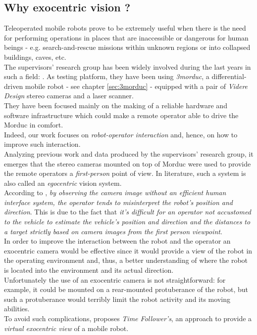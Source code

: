 \subsection{Why exocentric vision ?}
\label{sec:exo:why_exocetric}

Teleoperated mobile robots prove to be extremely useful 
when there is the need for performing operations in places that 
are inaccessible or dangerous for human beings - e.g. 
search-and-rescue missions within unknown regions or into 
collapsed buildings, caves, etc.
\\
The supervisors' research group has been widely involved 
during the last years in such a field: \cite{livatino2010}.
As testing platform, they have been using \textit{3morduc},
a differential-driven mobile robot - see chapter \ref{sec:3morduc} -
equipped with a pair of \textit{Videre Design} \cite{videredesign} 
stereo cameras and a laser scanner.
\\
They have been focused 
mainly on the making of a reliable hardware and software 
infrastructure which could make a remote operator able to drive 
the Morduc in comfort.
\\
Indeed, our work focuses on \textit{robot-operator interaction} and, 
hence, on how to improve such interaction. 
\\
Analyzing previous work and data produced by the supervisors' 
research group, it emerges that the stereo cameras mounted on 
top of Morduc were used to provide the remote operators a 
\textit{first-person} point of view. In literature, such a 
system is also called an \textit{egocentric} vision system.
\\
According to \cite{sugimoto}, \textit{by observing the camera image 
without an efficient human interface system, the operator 
tends to misinterpret the robot's position and direction}. This is 
due to the fact that \textit{it's difficult for an
operator not accustomed to the vehicle to estimate the
vehicle's position and direction and the distances to a
target strictly based on camera images from the first person 
viewpoint}.
\\
In order to improve the interaction between the robot and the operator 
an exocentric camera would be effective since it would provide a 
view of the robot in the operating environment and, thus, 
a better understanding of where the robot is located into the
environment and its actual direction.
\\
Unfortunately the use of an exocentric camera is not straightforward: 
for example, it could be mounted on a rear-mounted protuberance of the 
robot, but such a protuberance would terribly limit the robot activity and 
its moving abilities.
\\
To avoid such complications, \cite{sugimoto} proposes 
\textit{Time Follower's}, an approach to provide a \textit{virtual exocentric 
view} of a mobile robot.
